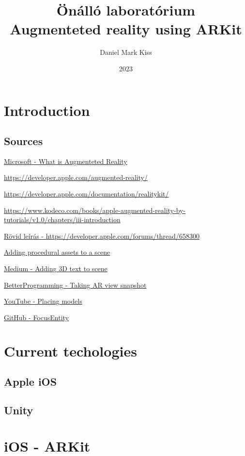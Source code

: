 \documentclass{report}
\title{\Huge{Önálló laboratórium}\\Augmenteted reality using ARKit}
\author{\huge{Daniel Mark Kiss}}
\date{2023}
\begin{document}
\maketitle
\newpage
\tableofcontents
\pagebreak

\chapter{Introduction}
\section{Sources}

\hyperlink{https://dynamics.microsoft.com/en-us/mixed-reality/guides/what-is-augmented-reality-ar/}{Microsoft - What is Augmenteted Reality}

\hyperlink{https://developer.apple.com/augmented-reality/}{https://developer.apple.com/augmented-reality/}

\hyperlink{https://developer.apple.com/documentation/realitykit/}{https://developer.apple.com/documentation/realitykit/}

\hyperlink{https://www.kodeco.com/books/apple-augmented-reality-by-tutorials/v1.0/chapters/iii-introduction}{https://www.kodeco.com/books/apple-augmented-reality-by-tutorials/v1.0/chapters/iii-introduction}

\hyperlink{https://developer.apple.com/forums/thread/658300}{Rövid leírás - https://developer.apple.com/forums/thread/658300}

\hyperlink{https://developer.apple.com/documentation/realitykit/adding-procedural-assets-to-a-scene}{Adding procedural assets to a scene}

\hyperlink{https://coledennis.medium.com/tutorial-generating-3d-text-with-realitykit-in-a-swiftui-app-fa2a50403012}{Medium - Adding 3D text to scene}

\hyperlink{https://betterprogramming.pub/take-an-arview-snapshot-in-realitykit-93b620cf99b3}{BetterProgramming - Taking AR view snapshot}

\hyperlink{https://www.youtube.com/watch?v=9R_G0EI-UoI}{YouTube - Placing models}

\hyperlink{https://github.com/maxxfrazer/FocusEntity}{GitHub - FocusEntity}

\chapter{Current techologies}

\section{Apple iOS}

\section{Unity}

\chapter{iOS - ARKit}
\end{document}

